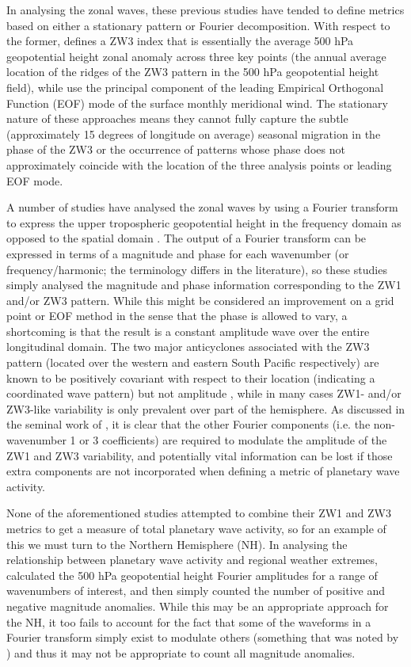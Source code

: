 In analysing the zonal waves, these previous studies have tended to define metrics based on either a stationary pattern or Fourier decomposition. With respect to the former, \citet{Raphael2004} defines a ZW3 index that is essentially the average 500 hPa geopotential height zonal anomaly across three key points (the annual average location of the ridges of the ZW3 pattern in the 500 hPa geopotential height field), while \citet{Yuan2008} use the principal component of the leading Empirical Orthogonal Function (EOF) mode of the surface monthly meridional wind. The stationary nature of these approaches means they cannot fully capture the subtle (approximately 15 degrees of longitude on average) seasonal migration in the phase of the ZW3 \citep{vanLoon1984,Mo1985} or the occurrence of patterns whose phase does not approximately coincide with the location of the three analysis points or leading EOF mode.

A number of studies have analysed the zonal waves by using a Fourier transform to express the upper tropospheric geopotential height in the frequency domain as opposed to the spatial domain \citep{Hobbs2007,Hobbs2010,Turner2013}. The output of a Fourier transform can be expressed in terms of a magnitude and phase for each wavenumber (or frequency/harmonic; the terminology differs in the literature), so these studies simply analysed the magnitude and phase information corresponding to the ZW1 and/or ZW3 pattern. While this might be considered an improvement on a grid point or EOF method in the sense that the phase is allowed to vary, a shortcoming is that the result is a constant amplitude wave over the entire longitudinal domain. The two major anticyclones associated with the ZW3 pattern (located over the western and eastern South Pacific respectively) are known to be positively covariant with respect to their location (indicating a coordinated wave pattern) but not amplitude \citep{Hobbs2010}, while in many cases ZW1- and/or ZW3-like variability is only prevalent over part of the hemisphere. As discussed in the seminal work of \citet{vanLoon1972}, it is clear that the other Fourier components (i.e. the non-wavenumber 1 or 3 coefficients) are required to modulate the amplitude of the ZW1 and ZW3 variability, and potentially vital information can be lost if those extra components are not incorporated when defining a metric of planetary wave activity. 

None of the aforementioned studies attempted to combine their ZW1 and ZW3 metrics to get a measure of total planetary wave activity, so for an example of this we must turn to the Northern Hemisphere (NH). In analysing the relationship between planetary wave activity and regional weather extremes, \citet{Screen2014} calculated the 500 hPa geopotential height Fourier amplitudes for a range of wavenumbers of interest, and then simply counted the number of positive and negative magnitude anomalies. While this may be an appropriate approach for the NH, it too fails to account for the fact that some of the waveforms in a Fourier transform simply exist to modulate others (something that was noted by \citet{Screen2014}) and thus it may not be appropriate to count all magnitude anomalies.


